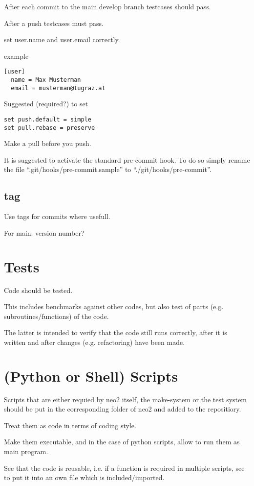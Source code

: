 \documentclass{article}
\begin{document}
After each commit to the main develop branch testcases should pass.

After a push testcases must pass.

set user.name and user.email correctly.

example
\begin{verbatim}
[user]
  name = Max Musterman
  email = musterman@tugraz.at
\end{verbatim}

Suggested (required?) to set
\begin{verbatim}
set push.default = simple
set pull.rebase = preserve
\end{verbatim}

Make a pull before you push.

It is suggested to activate the standard pre-commit hook. To do so
simply rename the file ``.git/hooks/pre-commit.sample'' to
``./git/hooks/pre-commit''.

\subsection{tag}

Use tags for commits where usefull.

For main: version number?

\section{Tests}
Code should be tested.

This includes benchmarks against other codes, but also test of parts
(e.g. subroutines/functions) of the code.

The latter is intended to verify that the code still runs correctly,
after it is written and after changes (e.g. refactoring) have been made.

\section{(Python or Shell) Scripts}
Scripts that are either requied by neo2 itself, the make-system or the
test system should be put in the corresponding folder of neo2 and added
to the repositiory.

Treat them as code in terms of coding style.

Make them executable, and in the case of python scripts, allow to run
them as main program.

See that the code is reusable, i.e. if a function is required in
multiple scripts, see to put it into an own file which is
included/imported.
\end{document}

